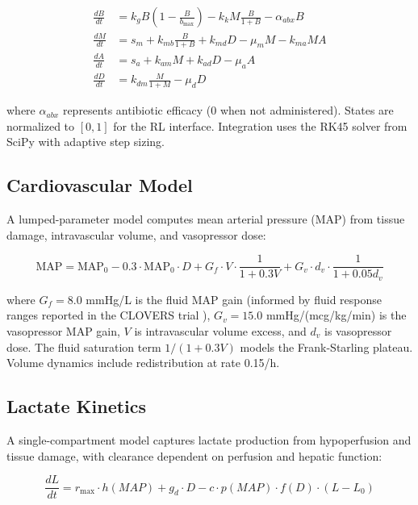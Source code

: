 \documentclass[11pt,a4paper]{article}
\begin{document}
\begin{align}
\frac{dB}{dt} &= k_g B \left(1 - \frac{B}{b_{\max}}\right) - k_k M \frac{B}{1+B} - \alpha_{abx} B \label{eq:bacteria} \\
\frac{dM}{dt} &= s_m + k_{mb} \frac{B}{1+B} + k_{md} D - \mu_m M - k_{ma} M A \label{eq:proinflam} \\
\frac{dA}{dt} &= s_a + k_{am} M + k_{ad} D - \mu_a A \label{eq:antiinflam} \\
\frac{dD}{dt} &= k_{dm} \frac{M}{1+M} - \mu_d D \label{eq:damage}
\end{align}

where $\alpha_{abx}$ represents antibiotic efficacy (0 when not administered). States are normalized to $[0,1]$ for the RL interface. Integration uses the RK45 solver from SciPy with adaptive step sizing.

\subsection{Cardiovascular Model}

A lumped-parameter model computes mean arterial pressure (MAP) from tissue damage, intravascular volume, and vasopressor dose:

\begin{equation}
    \text{MAP} = \text{MAP}_0 - 0.3 \cdot \text{MAP}_0 \cdot D + G_f \cdot V \cdot \frac{1}{1 + 0.3V} + G_v \cdot d_v \cdot \frac{1}{1 + 0.05 d_v}
\end{equation}

where $G_f = 8.0$ mmHg/L is the fluid MAP gain (informed by fluid response ranges reported in the CLOVERS trial \citep{shapiro2023clovers}), $G_v = 15.0$ mmHg/(mcg/kg/min) is the vasopressor MAP gain, $V$ is intravascular volume excess, and $d_v$ is vasopressor dose. The fluid saturation term $1/(1+0.3V)$ models the Frank-Starling plateau. Volume dynamics include redistribution at rate 0.15/h.

\subsection{Lactate Kinetics}

A single-compartment model captures lactate production from hypoperfusion and tissue damage, with clearance dependent on perfusion and hepatic function:

\begin{equation}
    \frac{dL}{dt} = r_{\max} \cdot h(MAP) + g_d \cdot D - c \cdot p(MAP) \cdot f(D) \cdot (L - L_0)
\end{equation}
\end{document}
